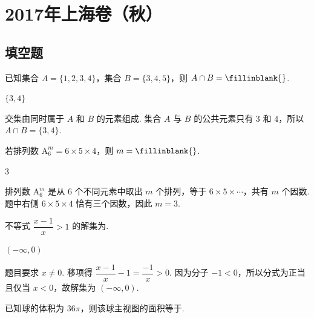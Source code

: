\chapter{2017年上海卷（秋）}

\section{填空题}

\begin{problem}
已知集合 \(A=\{1,2,3,4\}\)，集合 \(B=\{3,4,5\}\)，则 \(A\cap B=\fillinblank{}\).
\end{problem}

\begin{answer}
\(\{3,4\}\)
\end{answer}

\begin{solution}
交集由同时属于 \(A\) 和 \(B\) 的元素组成. 集合 \(A\) 与 \(B\) 的公共元素只有 \(3\) 和 \(4\)，所以 \(A\cap B=\{3,4\}\).
\end{solution}

\begin{problem}
若排列数 \(\mathrm A_6^m=6\times5\times4\)，则 \(m=\fillinblank{}\).
\end{problem}

\begin{answer}
\(3\)
\end{answer}

\begin{solution}
排列数 \(\mathrm A_6^m\) 是从 \(6\) 个不同元素中取出 \(m\) 个排列，等于 \(6\times5\times\cdots\)，共有 \(m\) 个因数. 题中右侧 \(6\times5\times4\) 恰有三个因数，因此 \(m=3\).
\end{solution}

\begin{problem}
不等式 \(\dfrac{x-1}{x}>1\) 的解集为\fillinblank{}.
\end{problem}

\begin{answer}
\((-\infty,0)\)
\end{answer}

\begin{solution}
题目要求 \(x\ne0\). 移项得 \(\dfrac{x-1}{x}-1=\dfrac{-1}{x}>0\). 因为分子 \(-1<0\)，所以分式为正当且仅当 \(x<0\)，故解集为 \((-\infty,0)\).
\end{solution}

\begin{problem}
已知球的体积为 \(36\pi\)，则该球主视图的面积等于\fillinblank{}.
\end{problem}

